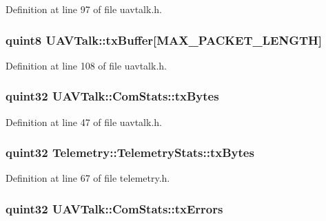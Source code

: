Definition at line 97 of file uavtalk.\-h.

\hypertarget{group___u_a_v_talk_plugin_ga7f0eb8c42215b435a77b84d7ffdbbfc3}{
\subsubsection[{tx\-Buffer}]{\setlength{\rightskip}{0pt plus 5cm}quint8 U\-A\-V\-Talk\-::tx\-Buffer\mbox{[}M\-A\-X\-\_\-\-P\-A\-C\-K\-E\-T\-\_\-\-L\-E\-N\-G\-T\-H\mbox{]}\hspace{0.3cm}{\ttfamily [protected]}}}\label{group___u_a_v_talk_plugin_ga7f0eb8c42215b435a77b84d7ffdbbfc3}


Definition at line 108 of file uavtalk.\-h.

\hypertarget{group___u_a_v_talk_plugin_ga6ab32543081346e61bdc67874617d3e1}{
\subsubsection[{tx\-Bytes}]{\setlength{\rightskip}{0pt plus 5cm}quint32 U\-A\-V\-Talk\-::\-Com\-Stats\-::tx\-Bytes}}\label{group___u_a_v_talk_plugin_ga6ab32543081346e61bdc67874617d3e1}


Definition at line 47 of file uavtalk.\-h.

\hypertarget{group___u_a_v_talk_plugin_ga349d8c0f2aac815d79b13e54f818658c}{
\subsubsection[{tx\-Bytes}]{\setlength{\rightskip}{0pt plus 5cm}quint32 Telemetry\-::\-Telemetry\-Stats\-::tx\-Bytes}}\label{group___u_a_v_talk_plugin_ga349d8c0f2aac815d79b13e54f818658c}


Definition at line 67 of file telemetry.\-h.

\hypertarget{group___u_a_v_talk_plugin_gaddc2324ebd5b83b73e1f873131efcccf}{
\subsubsection[{tx\-Errors}]{\setlength{\rightskip}{0pt plus 5cm}quint32 U\-A\-V\-Talk\-::\-Com\-Stats\-::tx\-Errors}}\label{group___u_a_v_talk_plugin_gaddc2324ebd5b83b73e1f873131efcccf}


